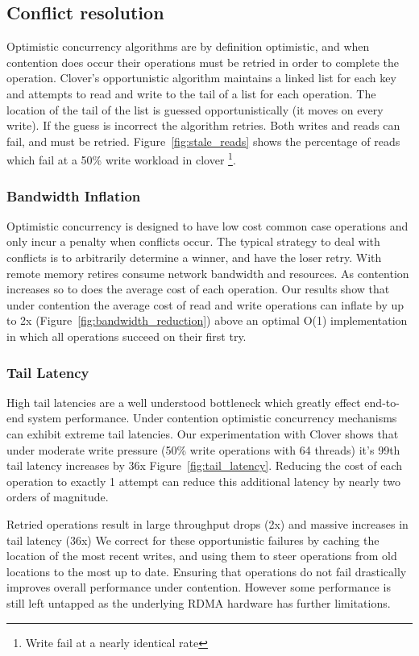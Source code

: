 \subsection{Conflict resolution}
Optimistic concurrency algorithms are by
definition optimistic, and when contention does occur their operations must be
retried in order to complete the operation. Clover's opportunistic algorithm
maintains a linked list for each key and attempts to read and write to the tail
of a list for each operation. The location of the tail of the list is guessed
opportunistically (it moves on every write). If the guess is incorrect the
algorithm retries. Both writes and reads can fail, and must be retried.
Figure~\ref{fig:stale_reads} shows the percentage of reads which fail at a 50\%
write workload in clover \footnote{Write fail at a nearly identical rate}.

\subsubsection{Bandwidth Inflation} 

Optimistic concurrency is designed to have low cost common case operations and
only incur a penalty when conflicts occur. The typical strategy to deal with
conflicts is to arbitrarily determine a winner, and have the loser retry. With
remote memory retires consume network bandwidth and resources. As contention
increases so to does the average cost of each operation. Our results show that
under contention the average cost of read and write operations can inflate by up
to 2x (Figure~\ref{fig:bandwidth_reduction}) above an optimal O(1)
implementation in which all operations succeed on their first try.

\subsubsection{Tail Latency}

High tail latencies are a well understood bottleneck which greatly effect
end-to-end system performance. Under contention optimistic concurrency
mechanisms can exhibit extreme tail latencies. Our experimentation with Clover
shows that under moderate write pressure (50\% write operations with 64 threads)
it's 99th tail latency increases by 36x Figure~\ref{fig:tail_latency}. Reducing the
cost of each operation to exactly 1 attempt can reduce this additional latency
by nearly two orders of magnitude.

Retried operations result in large throughput drops (2x) and massive increases
in tail latency (36x) We correct for these opportunistic failures by caching the
location of the most recent writes, and using them to steer operations from old
locations to the most up to date. Ensuring that operations do not fail
drastically improves overall performance under contention. However some
performance is still left untapped as the underlying RDMA hardware has further
limitations. 

